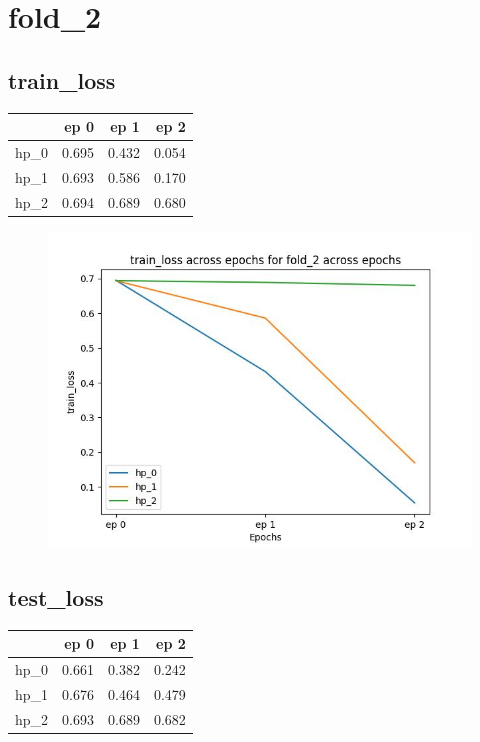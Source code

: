 \documentclass{article}
\begin{document}
\section{fold\_2}
\subsection{train\_loss}
\begin{tabular}{lrrr}
\toprule
{} &   ep 0 &   ep 1 &   ep 2 \\
\midrule
hp\_0 &  0.695 &  0.432 &  0.054 \\
hp\_1 &  0.693 &  0.586 &  0.170 \\
hp\_2 &  0.694 &  0.689 &  0.680 \\
\bottomrule
\end{tabular}

\begin{figure}[H]
\includegraphics[scale = 0.75]{fold_2/train_loss}
\end{figure}
\subsection{test\_loss}
\begin{tabular}{lrrr}
\toprule
{} &   ep 0 &   ep 1 &   ep 2 \\
\midrule
hp\_0 &  0.661 &  0.382 &  0.242 \\
hp\_1 &  0.676 &  0.464 &  0.479 \\
hp\_2 &  0.693 &  0.689 &  0.682 \\
\bottomrule
\end{tabular}
\end{document}
